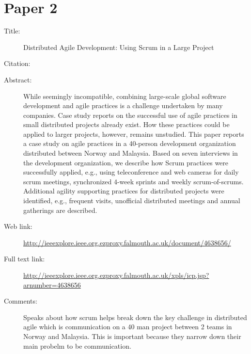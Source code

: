 \documentclass{scrartcl}
\begin{document}
\section*{Paper 2}
\begin{description}
\item[Title:] Distributed Agile Development: Using Scrum in a Large Project
\item[Citation:] \cite{bibtex_key}
\item[Abstract:] While seemingly incompatible, combining large-scale global software development and agile practices is a challenge undertaken by many companies. Case study reports on the successful use of agile practices in small distributed projects already exist. How these practices could be applied to larger projects, however, remains unstudied. This paper reports a case study on agile practices in a 40-person development organization distributed between Norway and Malaysia. Based on seven interviews in the development organization, we describe how Scrum practices were successfully applied, e.g., using teleconference and web cameras for daily scrum meetings, synchronized 4-week sprints and weekly scrum-of-scrums. Additional agility supporting practices for distributed projects were identified, e.g., frequent visits, unofficial distributed meetings and annual gatherings are described.
\item[Web link:] \url{http://ieeexplore.ieee.org.ezproxy.falmouth.ac.uk/document/4638656/}
\item[Full text link:] \url{http://ieeexplore.ieee.org.ezproxy.falmouth.ac.uk/xpls/icp.jsp?arnumber=4638656}
\item[Comments:] Speaks about how scrum helps break down the key challenge in distributed agile which is communication on a 40 man project between 2 teams in Norway and Malaysia. This is important because they narrow down their main probelm to be communication. 
\end{description}
\end{document}
